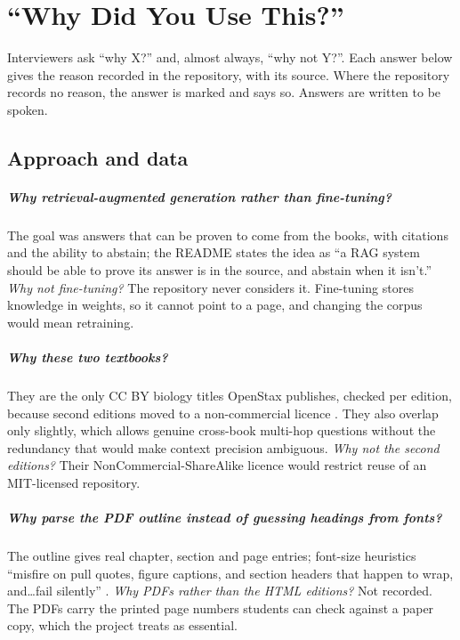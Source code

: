 \chapter{\enquote{Why Did You Use This?}}
\label{ch:why}

Interviewers ask \enquote{why X?} and, almost always, \enquote{why not Y?}. Each answer below gives the reason recorded in the repository, with its source. Where the repository records no reason, the answer is marked \tagI and says so. Answers are written to be spoken.

\section{Approach and data}

\paragraph{Why retrieval-augmented generation rather than fine-tuning?} The goal was answers that can be proven to come from the books, with citations and the ability to abstain; the README states the idea as \enquote{a RAG system should be able to prove its answer is in the source, and abstain when it isn't.} \emph{Why not fine-tuning?} The repository never considers it. \tagI Fine-tuning stores knowledge in weights, so it cannot point to a page, and changing the corpus would mean retraining.

\paragraph{Why these two textbooks?} They are the only CC BY biology titles OpenStax publishes, checked per edition, because second editions moved to a non-commercial licence . They also overlap only slightly, which allows genuine cross-book multi-hop questions without the redundancy that would make context precision ambiguous. \emph{Why not the second editions?} Their NonCommercial-ShareAlike licence would restrict reuse of an MIT-licensed repository.

\paragraph{Why parse the PDF outline instead of guessing headings from fonts?} The outline gives real chapter, section and page entries; font-size heuristics \enquote{misfire on pull quotes, figure captions, and section headers that happen to wrap, and\ldots fail silently} . \emph{Why PDFs rather than the HTML editions?} Not recorded. \tagI The PDFs carry the printed page numbers students can check against a paper copy, which the project treats as essential.

